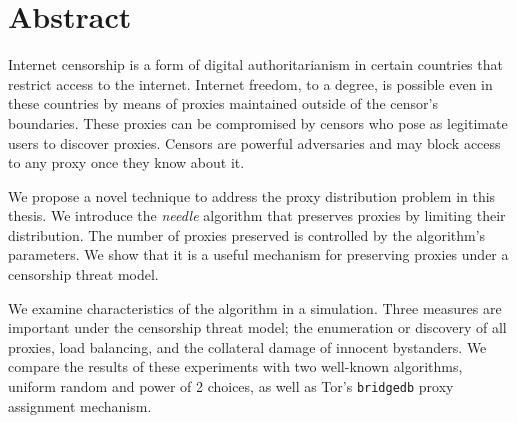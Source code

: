 \chapter{Abstract}
\label{sec:abstract}

Internet censorship is a form of digital authoritarianism in certain countries that restrict access to the internet. Internet freedom, to a degree, is possible even in these countries by means of proxies maintained outside of the censor's boundaries. These proxies can be compromised by censors who pose as legitimate users to discover proxies. Censors are powerful adversaries and may block access to any proxy once they know about it.

We propose a novel technique to address the proxy distribution problem in this thesis. We introduce the \textit{needle} algorithm that preserves proxies by limiting their distribution. The number of proxies preserved is controlled by the algorithm's parameters. We show that it is a useful mechanism for preserving proxies under a censorship threat model. 

We examine characteristics of the algorithm in a simulation. Three measures are important under the censorship threat model; the enumeration or discovery of all proxies, load balancing, and the collateral damage of innocent bystanders. We compare the results of these experiments with two well-known algorithms, uniform random and power of 2 choices, as well as Tor's \texttt{bridgedb} proxy assignment mechanism. 